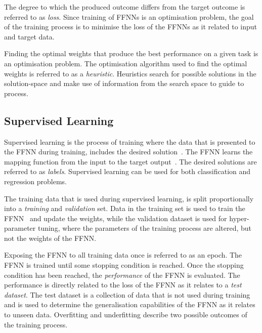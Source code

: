 The degree to which the produced outcome differs from the target outcome is referred to as \textit{loss}. Since training of \acp{FFNN} is an optimisation problem, the goal of the training process is to minimise the loss of the \acp{FFNN} as it related to input and target data.

Finding the optimal weights that produce the best performance on a given task is an optimisation problem. The optimisation algorithm used to find the optimal weights is referred to as a \textit{heuristic}. Heuristics search for possible solutions in the solution-space and make use of information from the search space to guide to process.


\subsection{Supervised Learning}
\label{sec:anns:training:supervised_learning}

Supervised learning is the process of training where the data that is presented to the \acs{FFNN} during training, includes the desired solution~\cite{ref:geron:2017}.  The \acs{FFNN} learns the mapping function from the input to the target output~\cite{ref:brownlee:2016}. The desired solutions are referred to as \textit{labels}. Supervised learning can be used for both classification and regression problems.

The training data that is used during supervised learning, is split proportionally into a \textit{training} and \textit{validation} set. Data in the training set is used to train the \acs{FFNN}~\cite{ref:james:2013} and update the weights, while the validation dataset is used for hyper-parameter tuning, where the parameters of the training process are altered, but not the weights of the \acs{FFNN}.

Exposing the \acs{FFNN} to all training data once is referred to as an
epoch. The \acs{FFNN} is trained until some stopping condition is reached. Once the stopping condition has been reached, the \textit{performance} of the \acs{FFNN} is evaluated. The performance is directly related to the loss of the \acs{FFNN} as it relates to a \textit{test dataset}. The test dataset is a collection of data that is not used during training and is used to determine the generalisation capabilities of the \acs{FFNN} as it relates to unseen data. Overfitting and underfitting describe two possible outcomes of the training process.


